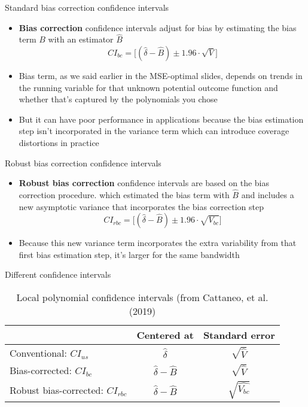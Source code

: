 \documentclass{beamer}
\begin{document}
\begin{frame}{Standard bias correction confidence intervals}

\begin{itemize}
\item \textbf{Bias correction} confidence intervals adjust for bias by estimating the bias term $B$ with an estimator $\widehat{B}$  $$CI_{bc}=\bigg [ ( \widehat{\delta} - \widehat{B} ) \pm 1.96 \cdot \sqrt{V} \bigg ]$$
\item Bias term, as we said earlier in the MSE-optimal slides, depends on trends in the running variable for that unknown potential outcome function and whether that's captured by the polynomials you chose
\item But it can have poor performance in applications because the bias estimation step isn't incorporated in the variance term which can introduce coverage distortions in practice
\end{itemize}

\end{frame}


\begin{frame}{Robust bias correction confidence intervals}

\begin{itemize}
\item \textbf{Robust bias correction} confidence intervals are based on the bias correction procedure. which estimated the bias term with $\widehat{B}$ and includes a new asymptotic variance that incorporates the bias correction step  $$CI_{rbc}=\bigg [ ( \widehat{\delta} - \widehat{B} ) \pm 1.96 \cdot \sqrt{V_{bc}} \bigg ]$$
\item Because this new variance term incorporates the extra variability from that first bias estimation step, it's larger for the same bandwidth
\end{itemize}
\end{frame}


\begin{frame}{Different confidence intervals}


\begin{table}[htbp]\centering
\caption{Local polynomial confidence intervals (from Cattaneo, et al. (2019)}
\centering
\begin{tabular}{l*{2}{c}}
\toprule
\multicolumn{1}{l}{\textbf{}}&
\multicolumn{1}{c}{\textbf{Centered at}}&
\multicolumn{1}{c}{\textbf{Standard error}}\\
\midrule
Conventional: $CI_{us}$	& $\widehat{\delta}$	& $\sqrt{\widehat{V}}$ \\
Bias-corrected: $CI_{bc}$	& $\widehat{\delta} - \widehat{B}$	& $\sqrt{\widehat{V}}$ \\
Robust bias-corrected: $CI_{rbc}$	& $\widehat{\delta} - \widehat{B}$	& $\sqrt{\widehat{V_{bc}}}$ \\
\bottomrule
\end{tabular}
\end{table}

\end{frame}
\end{document}
